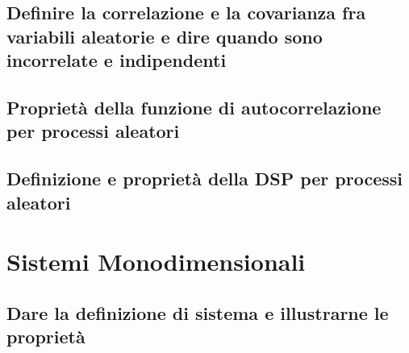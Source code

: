 \documentclass[12pt,oneside,openany]{memoir}
\numberwithin{equation}{subsection}
\begin{document}
\subsection{Definire la correlazione e la covarianza fra variabili aleatorie e
dire quando sono incorrelate e indipendenti}


\subsection{Propriet\`a della funzione di autocorrelazione per processi
aleatori}


\subsection{Definizione e propriet\`a della DSP per processi aleatori}


\newpage
\section{Sistemi Monodimensionali}


\subsection{Dare la definizione di sistema e illustrarne le propriet\`a}

\end{document}
